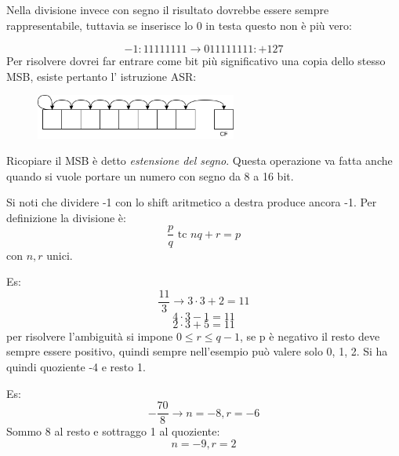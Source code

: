 Nella divisione invece con segno il risultato dovrebbe essere sempre rappresentabile, tuttavia se inserisce lo 0 in testa questo non è più vero:

$$ -1: 11111111 \xrightarrow{} 011111111 : +127 $$
Per risolvere dovrei far entrare come bit più significativo una copia dello stesso MSB, esiste pertanto l' istruzione ASR:
\begin{figure}[H]
    \centering
    \includegraphics[width=250px]{images/6_Instruction_set/ASR.png}
\end{figure}
Ricopiare il MSB è detto \emph{estensione del segno}.
Questa operazione va fatta anche quando si vuole portare un numero con segno da 8 a 16 bit.

Si noti che dividere -1 con lo shift aritmetico a destra produce ancora -1.
Per definizione la divisione è:
$$ \frac{p}{q} \text{ tc } nq + r = p $$
con $n,r$ unici.

Es: 
$$ \frac{11}{3} \xrightarrow{} 3 \cdot 3 + 2 = 11 $$
$$ 4 \cdot 3 - 1 = 11 $$
$$ 2 \cdot 3 + 5 = 11 $$
per risolvere l'ambiguità si impone $ 0 \leq r \leq q-1 $, se p è negativo il resto deve sempre essere positivo, quindi sempre nell'esempio può valere solo 0, 1, 2.
Si ha quindi quoziente -4 e resto 1.

Es:
$$ -\frac{70}{8} \xrightarrow{} n=-8, r=-6 $$
Sommo 8 al resto e sottraggo 1 al quoziente:
$$ n=-9, r=2 $$

